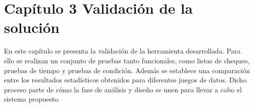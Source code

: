 \chapter*{Capítulo 3 \vspace{0.5cm} \break Validación de la solución}
\setcounter{chapter}{3}
\setcounter{section}{0}

En este capítulo se presenta la validación de la herramienta desarrollada. Para ello se realizan un conjunto de pruebas tanto funcionales, como listas de chequeo, pruebas de tiempo y pruebas de condición. Además se establece una comparación entre los resultados estadísticos obtenidos para diferentes juegos de datos. Dicho proceso parte de cómo la fase de análisis y diseño se unen para llevar a cabo el sistema propuesto.